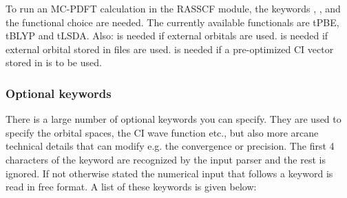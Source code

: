 To run an MC-PDFT calculation in the RASSCF module, the keywords , ,
 and the functional choice are needed. The currently available functionals are tPBE,
tBLYP and tLSDA. Also:  is needed if external orbitals are used.
 is needed if external orbital stored in  files are used.
 is needed if a pre-optimized CI vector stored in  is to be used.

\subsubsection{Optional keywords}

There is a large number of optional keywords you can specify. They are
used to specify the orbital spaces, the CI wave function etc., but also
more arcane technical details that can modify e.g. the convergence or
precision. The first 4 characters of the keyword are recognized by the
input parser and the rest is ignored. If not otherwise stated the numerical
input that follows a keyword is read in free format.
A list of these keywords is given below:

